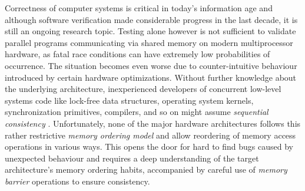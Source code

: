 Correctness of computer systems is critical in today's information age and although software verification made considerable progress in the last decade, it is still an ongoing research topic.
Testing alone however is not sufficient to validate parallel programs
communicating via shared memory on modern multiprocessor hardware,
as fatal race conditions can have extremely low probabilities of occurrence.
The situation becomes even worse due to counter-intuitive behaviour introduced by certain hardware optimizations.
Without further knowledge about the underlying architecture, inexperienced developers of
concurrent
low-level
systems code like lock-free data structures, operating system kernels, synchronization
primitives,
compilers,
and so on
might assume
\emph{sequential consistency} \cite{ref:Lamport79}.
Unfortunately, none of the major hardware architectures follows this rather restrictive \emph{memory ordering model} and allow
reordering of memory access operations
in various ways.
This opens the door for hard to find bugs caused by unexpected
behaviour
and
requires a deep understanding of the target architecture's memory ordering habits,
accompanied by careful use of \emph{memory barrier} operations to ensure consistency.



